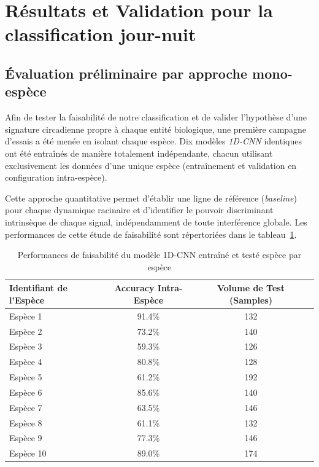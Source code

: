 \documentclass[12pt,a4paper,twoside]{article}
\begin{document}
\section{Résultats et Validation pour la classification jour-nuit}
\label{sec:resultats_analyse}
\subsection{Évaluation préliminaire par approche mono-espèce}
\label{subsec:approche_mono}

Afin de tester la faisabilité de notre classification et de valider l'hypothèse d'une signature circadienne propre à chaque entité biologique, une première campagne d'essais a été menée en isolant chaque espèce. Dix modèles \textit{1D-CNN} identiques ont été entraînés de manière totalement indépendante, chacun utilisant exclusivement les données d'une unique espèce (entraînement et validation en configuration intra-espèce). 

Cette approche quantitative permet d'établir une ligne de référence (\textit{baseline}) pour chaque dynamique racinaire et d'identifier le pouvoir discriminant intrinsèque de chaque signal, indépendamment de toute interférence globale. Les performances de cette étude de faisabilité sont répertoriées dans le tableau~\ref{tab:acc_mono_especes}.

\begin{table}[htbp]
\centering
\caption{Performances de faisabilité du modèle 1D-CNN entraîné et testé espèce par espèce}
\label{tab:acc_mono_especes}
\begin{tabular}{lccc}
\toprule
\textbf{Identifiant de l'Espèce} & \textbf{Accuracy Intra-Espèce} & \textbf{Volume de Test (Samples)} \\ 
\midrule
Espèce 1 & 91.4\% & 132 \\
Espèce 2 & 73.2\% & 140 \\
Espèce 3 & 59.3\% & 126 \\
Espèce 4 & 80.8\% & 128 \\
Espèce 5 & 61.2\% & 192 \\
Espèce 6 & 85.6\% & 140 \\
Espèce 7 & 63.5\% & 146 \\
Espèce 8 & 61.1\% & 132 \\
Espèce 9 & 77.3\% & 146 \\
Espèce 10 & 89.0\% & 174 \\ 
\bottomrule
\end{tabular}
\end{table}
\end{document}
